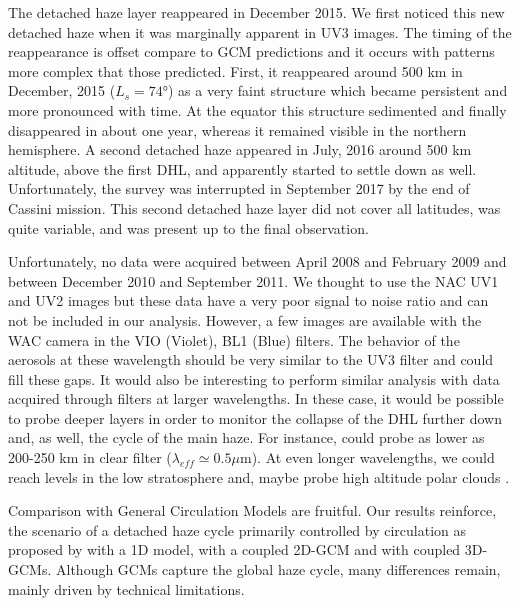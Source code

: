 The detached haze layer reappeared in December 2015. We first noticed this new detached haze when it was marginally
apparent in UV3 images.
The timing of the reappearance is offset compare to GCM predictions and it occurs with patterns more complex
that those predicted. First, it reappeared around 500 km in December, 2015 ($L_s =\ang{74}$) as a very faint
structure which became persistent and more pronounced with time.
At the equator this structure sedimented and finally disappeared in about one year, whereas it remained visible in the northern hemisphere.
A second detached haze appeared in July, 2016 around 500 km altitude, above the first DHL, and apparently started to settle down
as well. Unfortunately, the survey was interrupted in September 2017 by the end of Cassini mission. This second detached
haze layer did not cover all latitudes, was quite variable, and was present up to the final observation.

Unfortunately, no data were acquired between April 2008 and February 2009 and between December 2010 and September 2011.
We thought to use the NAC UV1 and UV2 images but these data have a very poor signal to noise ratio and
can not be included in our analysis.
However, a few images are available with the WAC camera in the VIO (Violet), BL1 (Blue) filters.
The behavior of the aerosols at these wavelength should be very similar to the UV3 filter and could fill these gaps.
It would also be interesting to perform similar analysis with data acquired through filters at larger wavelengths.
In these case, it would be possible to probe deeper layers in order to monitor the collapse of the DHL further
down and, as well, the cycle of the main haze. For instance, \cite{Rages1983} could probe as lower as 200-250 km
in clear filter ($\lambda_{eff} \simeq 0.5 \mu$m). At even longer wavelengths, we could reach levels in the low
stratosphere and, maybe probe high altitude polar clouds \citep{deKok2014,West2016}.

Comparison with General Circulation Models are fruitful. Our results reinforce, the scenario of a
detached haze cycle primarily controlled by circulation as proposed by \cite{Toon1992} with a 1D model, \cite{Rannou2002}
with a coupled 2D-GCM and \cite{Lebonnois2012, Larson2015} with coupled 3D-GCMs. Although GCMs capture the global
haze cycle, many differences remain, mainly driven by technical limitations.